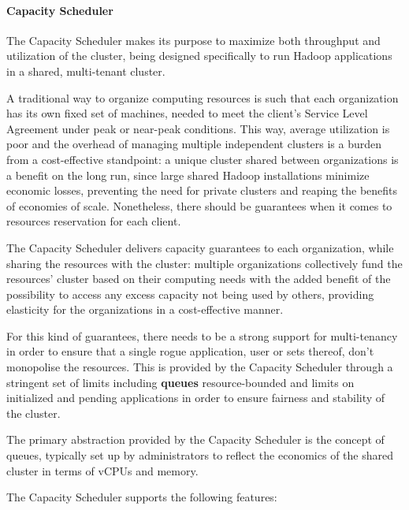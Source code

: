 \paragraph{Capacity Scheduler}

The Capacity Scheduler makes its purpose to maximize both throughput and utilization of the cluster, being designed specifically to run Hadoop applications in a shared, multi-tenant cluster.

A traditional way to organize computing resources is such that each organization has its own fixed set of machines, needed to meet the client’s Service Level Agreement under peak or near-peak conditions. This way, average utilization is poor and the overhead of managing multiple independent clusters is a burden from a cost-effective standpoint: a unique cluster shared between organizations is a benefit on the long run, since large shared Hadoop installations minimize economic losses, preventing the need for private clusters and reaping the benefits of economies of scale. Nonetheless, there should be guarantees when it comes to resources reservation for each client.

The Capacity Scheduler delivers capacity guarantees to each organization, while sharing the resources with the cluster: multiple organizations collectively fund the resources' cluster based on their computing needs with the added benefit of the possibility to access any excess capacity not being used by others, providing elasticity for the organizations in a cost-effective manner.

For this kind of guarantees, there needs to be a strong support for multi-tenancy in order to ensure that a single rogue application, user or sets thereof, don't monopolise the resources. This is provided by the Capacity Scheduler through a stringent set of limits including \textbf{queues} resource-bounded and limits on initialized and pending applications in order to ensure fairness and stability of the cluster.

The primary abstraction provided by the Capacity Scheduler is the concept of queues, typically set up by administrators to reflect the economics of the shared cluster in terms of vCPUs and memory.

The Capacity Scheduler supports the following features:

